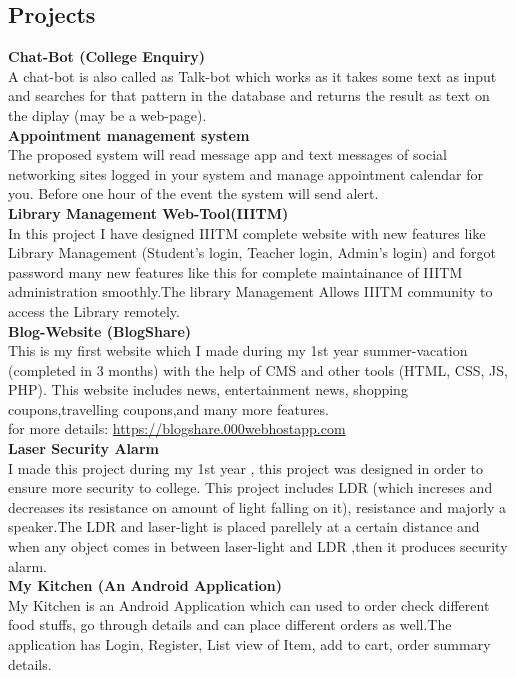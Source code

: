 \documentclass[margin,line]{res}
\begin{document}
\begin{resume}
\section{\sc Projects}
{\bf Chat-Bot (College Enquiry)}\\
A chat-bot is also called as Talk-bot which works as it takes some text as input and searches for that pattern in the database and returns the result as text on the diplay (may be a web-page). \\

{\bf Appointment management system }\\
The proposed system will read message app and text messages of social networking sites logged in your system and manage appointment calendar for you. Before one hour of the event the system will send alert.\\

{\bf Library Management Web-Tool(IIITM)}\\
In this project I have designed IIITM complete website with new features like Library Management (Student's login, Teacher login, Admin's login) and forgot password many new features like this for complete maintainance of IIITM administration smoothly.The library Management Allows IIITM community to access the Library remotely.
\\

{\bf Blog-Website (BlogShare) }\\
This is my first website which I made during my 1st year summer-vacation (completed in 3 months) with the help of CMS and other tools (HTML, CSS, JS, PHP). This website includes news, entertainment news, shopping coupons,travelling coupons,and many more features.
\\for more details: \url{https://blogshare.000webhostapp.com} 
\\

{\bf Laser Security Alarm }\\
I made this project during my 1st year , this project was designed in order to ensure more security to college. This project includes LDR (which increses and decreases its resistance on amount of light falling on it), resistance and majorly a speaker.The LDR and laser-light is placed parellely at a certain distance and when any object comes in between laser-light and LDR ,then it produces security alarm.
\\

{\bf My Kitchen (An Android Application) }\\
My Kitchen is an Android Application which can used to order check different food stuffs, go through details and can place different orders as well.The application has Login, Register, List view of Item, add to cart, order summary details.
\\

\end{resume}
\end{document}
